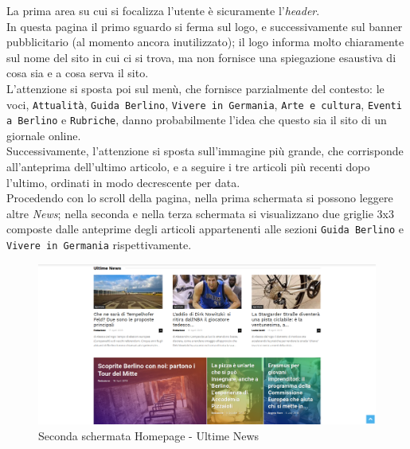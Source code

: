 La prima area su cui si focalizza l'utente è sicuramente l'\textit{header}. \\
In questa pagina il primo sguardo si ferma sul logo, e successivamente sul banner pubblicitario (al momento ancora inutilizzato); il logo informa molto chiaramente sul nome del sito in cui ci si trova, ma non fornisce una spiegazione esaustiva di cosa sia e a cosa serva il sito. \\
L'attenzione si sposta poi sul menù, che fornisce parzialmente del contesto: le voci, \texttt{Attualità}, \texttt{Guida Berlino}, \texttt{Vivere in Germania}, \texttt{Arte e cultura}, \texttt{Eventi a Berlino} e \texttt{Rubriche}, danno probabilmente l'idea che questo sia il sito di un giornale online. \\
Successivamente, l'attenzione si sposta sull'immagine più grande, che corrisponde all'anteprima dell'ultimo articolo, e a seguire i tre articoli più recenti dopo l'ultimo, ordinati in modo decrescente per data. \\
Procedendo con lo scroll della pagina, nella prima schermata si possono leggere altre \textit{News}; nella seconda e nella terza schermata si visualizzano due griglie 3x3 composte dalle anteprime degli articoli appartenenti alle sezioni \texttt{Guida Berlino} e \texttt{Vivere in Germania} rispettivamente. \\

\vspace{30pt}
\begin{figure}[htbp]
\begin{center}
\includegraphics[width=35em]{img/home2}
\caption{Seconda schermata Homepage - Ultime News}
\end{center}
\end{figure}
\vspace{30pt}

